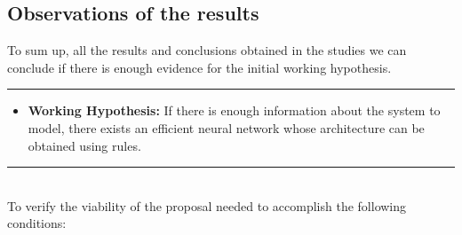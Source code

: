\documentclass[a4paper, 11pt]{article}
\begin{document}
\subsection{Observations of the results}
To sum up, all the results and conclusions obtained in the studies we can conclude if there is enough evidence for the initial working hypothesis.\\
\rule{\linewidth}{0.4pt}
\begin{itemize}
    \item \textbf{Working Hypothesis:} If there is enough information about the system to model,
    there exists an efficient neural network whose architecture can be obtained using
    rules.
\end{itemize}
\rule{\linewidth}{0.4pt}\\ \vspace{0.5em}
To verify the viability of the proposal needed to accomplish the following conditions:
\newpage
\end{document}
